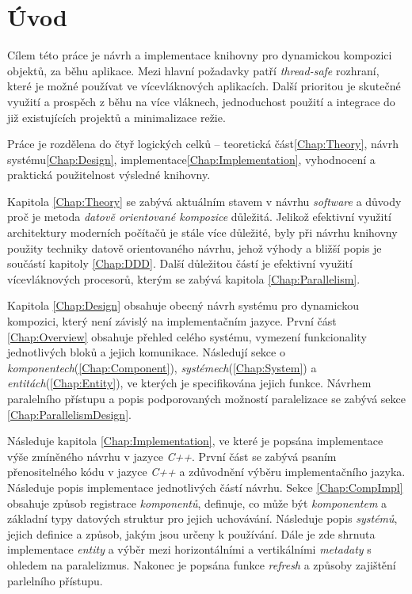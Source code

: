 

\chapter{Úvod}
\blind[1]
\blind[1]
\blind[1]
\blind[1]

Cílem této práce je návrh a implementace knihovny pro dynamickou kompozici objektů, za běhu aplikace. Mezi hlavní požadavky patří \emph{thread-safe}\cite{ThreadSafety} rozhraní, které je možné používat ve vícevláknových aplikacích. Další prioritou je skutečné využití a prospěch z běhu na více vláknech, jednoduchost použití a integrace do již existujících projektů a minimalizace režie.

Práce je rozdělena do čtyř logických celků -- teoretická část\ref{Chap:Theory}, návrh systému\ref{Chap:Design}, implementace\ref{Chap:Implementation}, vyhodnocení a praktická použitelnost výsledné knihovny.

Kapitola \ref{Chap:Theory} se zabývá aktuálním stavem v návrhu \emph{software} a důvody proč je metoda \emph{datově orientované kompozice} důležitá. Jelikož efektivní využití architektury moderních počítačů je stále více důležité, byly při návrhu knihovny použity techniky datově orientovaného návrhu\cite{DataOrientedDesign}, jehož výhody a bližší popis je součástí kapitoly \ref{Chap:DDD}. Další důležitou částí je efektivní využití vícevláknových procesorů, kterým se zabývá kapitola \ref{Chap:Parallelism}.

Kapitola \ref{Chap:Design} obsahuje obecný návrh systému pro dynamickou kompozici, který není závislý na implementačním jazyce. První část \ref{Chap:Overview} obsahuje přehled celého systému, vymezení funkcionality jednotlivých bloků a jejich komunikace. Následují sekce o \emph{komponentech}(\ref{Chap:Component}), \emph{systémech}(\ref{Chap:System}) a \emph{entitách}(\ref{Chap:Entity}), ve kterých je specifikována jejich funkce. Návrhem paralelního přístupu a popis podporovaných možností paralelizace se zabývá sekce \ref{Chap:ParallelismDesign}.

Následuje kapitola \ref{Chap:Implementation}, ve které je popsána implementace výše zmíněného návrhu v jazyce \emph{C++}. První část se zabývá psaním přenositelného kódu v jazyce \emph{C++} a zdůvodnění výběru implementačního jazyka. Následuje popis implementace jednotlivých částí návrhu. Sekce \ref{Chap:CompImpl} obsahuje způsob registrace \emph{komponentů}, definuje, co může být \emph{komponentem} a základní typy datových struktur pro jejich uchovávání. Následuje popis \emph{systémů}, jejich definice a způsob, jakým jsou určeny k používání. Dále je zde shrnuta implementace \emph{entity} a výběr mezi horizontálními a vertikálními \emph{metadaty} s ohledem na paralelizmus. Nakonec je popsána funkce \emph{refresh} a způsoby zajištění parlelního přístupu.

